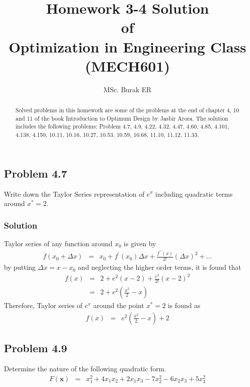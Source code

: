 \documentclass[]{report}
\title{ Homework 3-4 Solution \\ \centering of \\ \centering Optimization in Engineering Class\\ \centering (MECH601)}
\author{MSc. Burak ER}
\begin{document}
\maketitle

\begin{abstract}
Solved problems in this homework are some of the problems at the end of chapter 4, 10 and 11 of the book Introduction to Optimum Design by Jasbir Arora\cite{arora2004introduction}. The solution includes the following problems; Problem 4.7, 4.9, 4.22, 4.32, 4.47, 4.60, 4.85, 4.101, 4.138, 4.150, 10.11, 10.16, 10.27, 10.53, 10.59, 10.68, 11.10, 11.12, 11.33.
\end{abstract}
\subsection*{Problem 4.7}
Write down the Taylor Series representation of $e^x$ including quadratic terms around $x^*=2$.
\subsubsection*{Solution}
Taylor series of any function around $x_0$ is given by
\begin{eqnarray}
f\left(x_0+\Delta x\right)&=&x_0+f^\prime\left(x_0\right)\Delta x+\frac{f^{\prime \prime}\left(x\right)}{2!}\left(\Delta x\right)^2+\dots
\end{eqnarray}
by putting $\Delta x=x-x_0$ and neglecting the higher order terms, it is found that
\begin{eqnarray*}
f\left(x\right)&=&2+e^2\left(x-2\right)+\frac{e^2}{2!}\left(x-2\right)^2 \\
&=&2+e^2\left(\frac{x^2}{2}-x\right)
\end{eqnarray*}
Therefore, Taylor series of $e^x$ around the point $x^*=2$ is found as
\begin{eqnarray*}
f\left(x\right)&=& e^2\left(\frac{x^2}{2}-x\right)+2
\end{eqnarray*}
\subsection*{Problem 4.9}
Determine the nature of the following quadratic form.
\begin{eqnarray}
F\left(\mathbf{x}\right)&=&x_1^2+4x_1x_2+2x_1x_3-7x_2^2-6x_2x_3+5x_3^2
\label{eqproblem:4.9}
\end{eqnarray}
\end{document}
